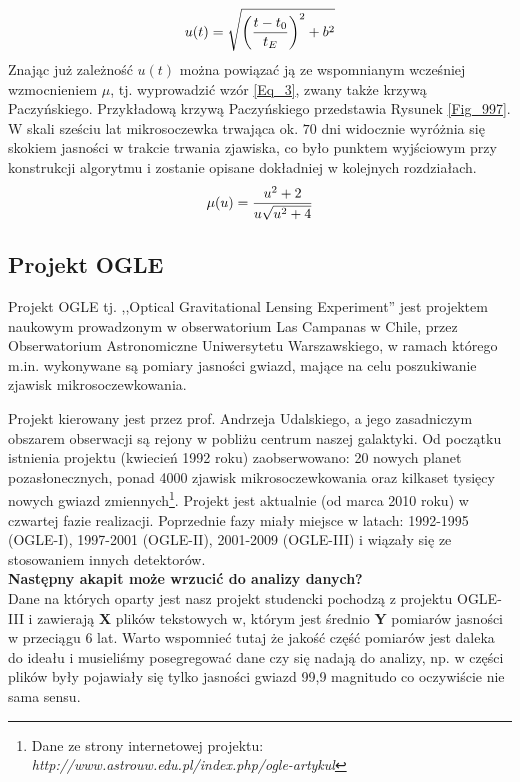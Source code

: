 \documentclass[a4paper,11pt]{article}
\newcommand{\ak}{\hspace{0.7 cm}}
\begin{document}
\begin{equation}
\centering
u(t)=\sqrt{\left(\frac{t-t_{0}}{t_{E}}\right)^{2}+b^{2}}
\label{Eq_2}
\end{equation}
\ak Znając już zależność $u(t)$ można powiązać ją ze wspomnianym wcześniej wzmocnieniem $\mu$, tj. wyprowadzić wzór \ref{Eq_3}, zwany także krzywą Paczyńskiego. Przykładową krzywą Paczyńskiego przedstawia Rysunek \ref{Fig_997}. %
W skali sześciu lat mikrosoczewka trwająca ok. $70$ dni widocznie wyróżnia się skokiem jasności w trakcie trwania zjawiska, co było punktem wyjściowym przy konstrukcji algorytmu i zostanie opisane dokładniej w kolejnych rozdziałach.
\begin{equation}
\centering
\mu(u)=\frac{u^{2}+2}{u\sqrt{u^{2}+4}}
\label{Eq_3}
\end{equation}
\flushleft
\subsection{Projekt OGLE}

\ak Projekt OGLE  tj. ,,Optical Gravitational Lensing Experiment'' jest projektem naukowym prowadzonym w obserwatorium Las Campanas w Chile, przez Obserwatorium Astronomiczne Uniwersytetu Warszawskiego, w ramach którego m.in. wykonywane są pomiary jasności gwiazd, mające na celu poszukiwanie zjawisk mikrosoczewkowania. 

\ak Projekt kierowany jest przez prof. Andrzeja Udalskiego, a jego zasadniczym obszarem obserwacji są rejony w pobliżu centrum naszej galaktyki. Od początku istnienia projektu (kwiecień 1992 roku) zaobserwowano: 20 nowych planet pozasłonecznych, ponad 4000 zjawisk mikrosoczewkowania oraz kilkaset tysięcy nowych gwiazd zmiennych\footnote{Dane ze strony internetowej projektu: \textit{http://www.astrouw.edu.pl/index.php/ogle-artykul}}. Projekt jest aktualnie (od marca 2010 roku) w czwartej fazie realizacji. Poprzednie fazy miały miejsce w latach: 1992-1995 (OGLE-I), 1997-2001 (OGLE-II), 2001-2009 (OGLE-III) i wiązały się ze stosowaniem innych detektorów.
 \\
\textbf{Następny akapit może wrzucić do analizy danych?} 
 \\
\ak Dane na których oparty jest nasz projekt studencki pochodzą z projektu OGLE-III i zawierają \textbf{X} plików tekstowych w, którym jest średnio \textbf{Y} pomiarów jasności w przeciągu 6 lat. Warto wspomnieć tutaj że jakość część pomiarów jest daleka do ideału i musieliśmy posegregować dane czy się nadają do analizy, np. w części plików były pojawiały się tylko jasności gwiazd 99,9 magnitudo co oczywiście nie sama sensu.
\end{document}
